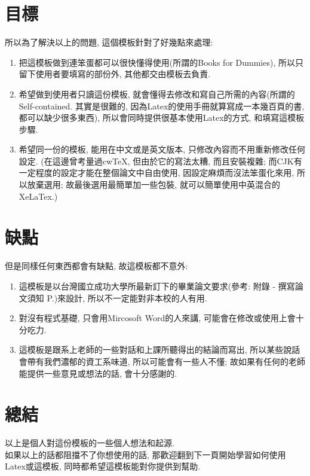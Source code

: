 \section{目標}
所以為了解決以上的問題, 這個模板針對了好幾點來處理:

\begin{enumerate}

  \item 把這模板做到連笨蛋都可以很快懂得使用(所謂的Books for Dummies), 所以只留下使用者要填寫的部份外, 其他都交由模板去負責.

  \item 希望做到使用者只讀這份模板, 就會懂得去修改和寫自己所需的內容(所謂的Self-contained. 其實是很難的, 因為Latex的使用手冊就算寫成一本幾百頁的書, 都可以缺少很多東西), 所以會同時提供很基本使用Latex的方式, 和填寫這模板步驟.

  \item 希望同一份的模板, 能用在中文或是英文版本, 只修改內容而不用重新修改任何設定. (在這邊曾考量過cwTeX, 但由於它的寫法太糟, 而且安裝複雜\cite{web:latex:cwtex}; 而CJK有一定程度的設定才能在整個論文中自由使用, 因設定麻煩而沒法笨蛋化來用, 所以放棄選用; 故最後選用最簡單加一些包裝, 就可以簡單使用中英混合的XeLaTex.)

\end{enumerate}

\section{缺點}
但是同樣任何東西都會有缺點, 故這模板都不意外:

\begin{enumerate}

  \item 這模板是以台灣國立成功大學所最新訂下的畢業論文要求(參考: 附錄 - 撰寫論文須知 P.\pageref{appendix:thesis-spec})來設計, 所以不一定能對非本校的人有用.

  \item 對沒有程式基礎, 只會用Mircosoft Word的人來講, 可能會在修改或使用上會十分吃力.

  \item 這模板是跟系上老師的一些對話和上課所聽得出的結論而寫出, 所以某些說話會帶有我們濃郁的資工系味道, 所以可能會有一些人不懂; 故如果有任何的老師能提供一些意見或想法的話, 會十分感謝的.

\end{enumerate}

\section{總結}

以上是個人對這份模板的一些個人想法和起源.\\

如果以上的話都阻擋不了你想使用的話, 那歡迎翻到下一頁開始學習如何使用Latex或這模板, 同時都希望這模板能對你提供到幫助.

\clearpage


